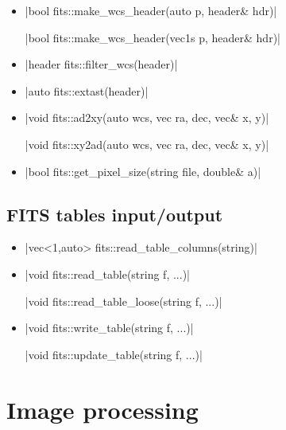 \documentclass[12pt]{report}
\begin{document}
\begin{itemize}
\item \cppinline|bool fits::make_wcs_header(auto p, header& hdr)| 

\cppinline|bool fits::make_wcs_header(vec1s p, header& hdr)|

\item \cppinline|header fits::filter_wcs(header)| 

\item \cppinline|auto fits::extast(header)| 

\item \cppinline|void fits::ad2xy(auto wcs, vec ra, dec, vec& x, y)| 

\cppinline|void fits::xy2ad(auto wcs, vec ra, dec, vec& x, y)| 

\item \cppinline|bool fits::get_pixel_size(string file, double& a)| 

\end{itemize}

\subsection{FITS tables input/output \label{SEC:support:fits:table}}

\begin{itemize}
\item \cppinline|vec<1,auto> fits::read_table_columns(string)| 

\item \cppinline|void fits::read_table(string f, ...)| 

\cppinline|void fits::read_table_loose(string f, ...)| 

\item \cppinline|void fits::write_table(string f, ...)| 

\cppinline|void fits::update_table(string f, ...)| 

\end{itemize}


\section{Image processing \label{SEC:support:image}}
\end{document}
